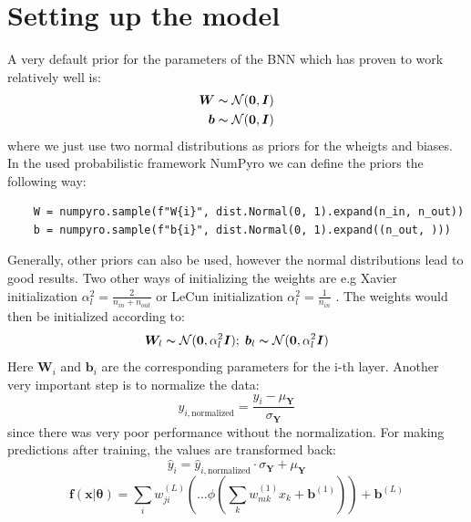 \documentclass{article}
\newcommand{\Norm}{\mathcal{N}}
\begin{document}
\section{Setting up the model}
A very default prior for the parameters of the BNN which has proven to work relatively well \cite{BNNTut} is:
\begin{align}
    \bm W \thicksim \mathcal{N}(\bm 0,\bm I)\\
    \bm b \thicksim \mathcal{N}(\bm 0, \bm I)
\end{align}
where we just use two normal distributions as priors for the wheigts and biases. In the used probabilistic framework NumPyro we can define the priors the following way:
\begin{lstlisting}
    W = numpyro.sample(f"W{i}", dist.Normal(0, 1).expand(n_in, n_out))
    b = numpyro.sample(f"b{i}", dist.Normal(0, 1).expand((n_out, )))
\end{lstlisting}
Generally, other priors can also be used, however the normal distributions lead to good results. Two  other ways of initializing the weights are e.g Xavier initialization $\alpha_l^2 = \tfrac{2}{n_{in}+n_{out}}$ or LeCun initialization $\alpha_l^2 = \tfrac{1}{n_{in}}$ \cite{murphy}. The weights would then be initialized according to:
\begin{equation}
    \bm W_l \thicksim \Norm(\bm 0, \alpha_l^2 \bm I); \; \bm b_l \thicksim \Norm(\bm 0, \alpha_l^2 \bm I)
\end{equation}
Here $\bm W_i$ and $\bm b_i$ are the corresponding parameters for the i-th layer. Another very important step is to normalize the data:
\begin{equation}
     y_{i, \text{normalized}} = \frac{ y_i - \mu_{\bm Y}}{\sigma_{\bm Y}}
\end{equation}
since there was very poor performance without the normalization. For making predictions after training, the values are transformed back:
\begin{equation}
    \hat{y}_i = \hat{y}_{i,\text{normalized}} \cdot {\sigma_{\bm Y}} + \mu_{\bm Y}
\end{equation}
\begin{equation}
    \bm f(\bm x|\bm \theta) = \sum_i w^{(L)}_{ji} \left( \ldots \phi \left( \sum_k w^{(1)}_{mk}x_k + \bm b^{(1)} \right) \right) + \bm b^{(L)}
\end{equation}
\end{document}
